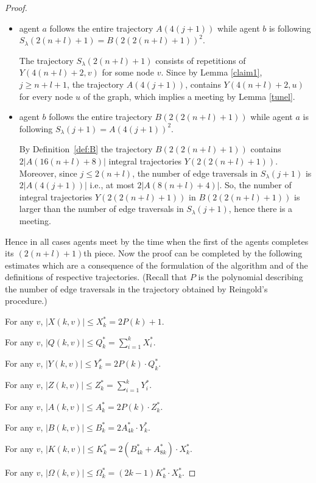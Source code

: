 \documentclass [11pt] {article}
\begin{document}
\begin{proof}
\begin{itemize}

\item agent $a$ follows the entire trajectory $A(4(j+1))$ while agent $b$ is following $S_{\lambda}(2(n+l)+1)=B(2(2(n+l)+1))^2$. 

The trajectory $S_{\lambda}(2(n+l)+1)$ consists of repetitions of {$Y(4(n+l)+2,v)$} for some node $v$.  Since by Lemma \ref{claim1}, $j\ge n+l+1$, the trajectory
$A(4(j+1))$, contains $Y(4(n+l)+2,u)$  for every node $u$ of the graph, which implies a meeting by Lemma \ref{tunel}.

\item agent $b$ follows the entire trajectory $B(2(2(n+l)+1))$ while agent $a$ is following $S_{\lambda}(j+1)=A(4(j+1))^2$. 

By Definition~\ref{def:B} the trajectory $B(2(2(n+l)+1))$ contains $2|A(16(n+l)+8)|$ integral trajectories $Y(2(2(n+l)+1))$. Moreover, since $j\le 2(n+l)$, the number of {edge traversals} in $S_{\lambda}(j+1)$ is $2|A(4(j+1))|$ i.e., at most $2|A(8(n+l)+4)|$. So, the number of integral trajectories $Y(2(2(n+l)+1))$ in $B(2(2(n+l)+1))$ is larger than the number of {edge traversals} in $S_{\lambda}(j+1)$, hence there is a meeting.
\end{itemize}

{Hence in all cases agents meet by the time when the first of the agents completes its $(2(n+l)+1)$th piece}. Now the proof can be completed by the following estimates which are a consequence of the formulation of the algorithm and of the definitions of respective trajectories.
 (Recall that $P$ is the
polynomial describing the number of edge traversals in the trajectory obtained by Reingold's procedure.)


For any $v$, $|X(k,v)| \leq X^*_k=2P(k)+1$.

For any $v$, $|Q(k,v)| \leq Q^*_k= \sum_{i=1}^k X^*_i$.

For any $v$, $|Y(k,v)| \leq Y^*_k=2P(k) \cdot Q^*_k$.

For any $v$, $|Z(k,v)| \leq Z^*_k= \sum_{i=1}^k Y^*_i$.

For any $v$, $|A(k,v)| \leq A^*_k=2P(k) \cdot Z^*_k$.

{For any $v$, $|B(k,v)| \leq B^*_k=2A^*_{4k} \cdot Y^*_k$.}

{For any $v$, $|K(k,v)| \leq K^*_k=2(B^*_{4k}+A^*_{8k}) \cdot X^*_k$.}

For any $v$, $|\Omega(k,v)| \leq \Omega^*_k=(2k-1)K^*_{k} \cdot X^*_k$.


\end{proof}
\end{document}
